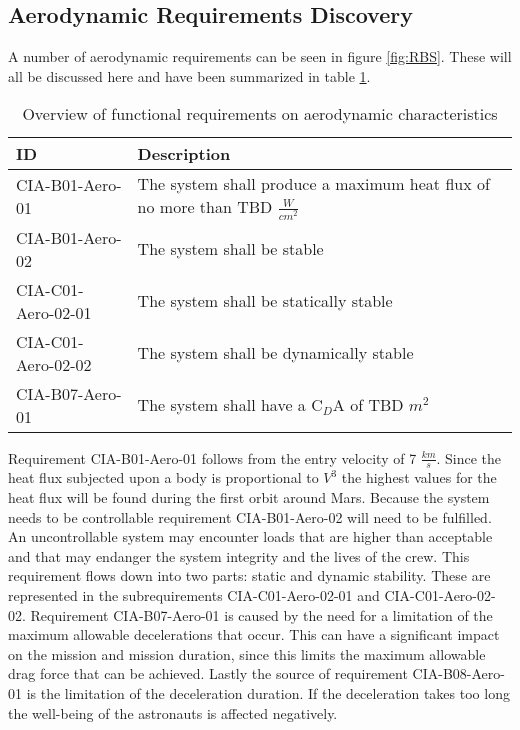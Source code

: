 \subsection{Aerodynamic Requirements Discovery} 
\label{sec:aero}
A number of aerodynamic requirements can be seen in figure \ref{fig:RBS}. These will all be discussed here and have been summarized in table \ref{tab:aeroreqs}. 


\begin{table}[h]
	\caption{Overview of functional requirements on aerodynamic characteristics}
	\label{tab:aeroreqs}
	\begin{tabular}{|p{}|p{}|}
		\hline
		ID & Description \\
		\hline \hline
		CIA-B01-Aero-01 & The system shall produce a maximum heat flux of no more than TBD $\frac{W}{cm^{2}}$ \\ \hline
		CIA-B01-Aero-02 & The system shall be stable \\ \hline
		CIA-C01-Aero-02-01 & The system shall be statically stable \\ \hline
		CIA-C01-Aero-02-02 & The system shall be dynamically stable \\ \hline
		CIA-B07-Aero-01 & The system shall have a C$_{D}$A of TBD $m^{2}$ \\ \hline
	\end{tabular}
\end{table}

Requirement CIA-B01-Aero-01 follows from the entry velocity of 7 $\frac{km}{s}$. Since the heat flux subjected upon a body is proportional to $V^{3}$ \cite{Tauber1986} the highest values for the heat flux will be found during the first orbit around Mars. 
Because the system needs to be controllable requirement CIA-B01-Aero-02 will need to be fulfilled. An uncontrollable system may encounter loads that are higher than acceptable and that may endanger the system integrity and the lives of the crew. This requirement flows down into two parts: static and dynamic stability. These are represented in the subrequirements CIA-C01-Aero-02-01 and CIA-C01-Aero-02-02.
Requirement CIA-B07-Aero-01 is caused by the need for a limitation of the maximum allowable decelerations that occur. This can have a significant impact on the mission and mission duration, since this limits the maximum allowable drag force that can be achieved.
Lastly the source of requirement CIA-B08-Aero-01 is the limitation of the deceleration duration. If the deceleration takes too long the well-being of the astronauts is affected negatively.